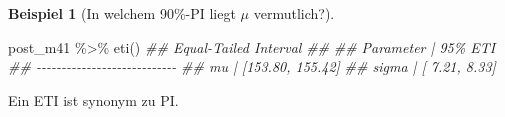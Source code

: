 \documentclass[
  a4paper,
  DIV=11]{scrreprt}
\newenvironment{Shaded}{\begin{snugshade}}{\end{snugshade}}
\newcommand{\DocumentationTok}[1]{\textcolor[rgb]{0.37,0.37,0.37}{\textit{#1}}}
\newcommand{\FunctionTok}[1]{\textcolor[rgb]{0.28,0.35,0.67}{#1}}
\newcommand{\NormalTok}[1]{\textcolor[rgb]{0.00,0.23,0.31}{#1}}
\newcommand{\SpecialCharTok}[1]{\textcolor[rgb]{0.37,0.37,0.37}{#1}}
\theoremstyle{definition}
\newtheorem{example}{Beispiel}[chapter]
\theoremstyle{remark}
\begin{document}
\leavevmode{}%
\begin{example}[In welchem 90\%-PI liegt \(\mu\)
vermutlich?]\label{exm-kung4}

\begin{Shaded}
\begin{Highlighting}[]
\NormalTok{post\_m41 }\SpecialCharTok{\%\textgreater{}\%} 
  \FunctionTok{eti}\NormalTok{()}
\DocumentationTok{\#\# Equal{-}Tailed Interval}
\DocumentationTok{\#\# }
\DocumentationTok{\#\# Parameter |          95\% ETI}
\DocumentationTok{\#\# {-}{-}{-}{-}{-}{-}{-}{-}{-}{-}{-}{-}{-}{-}{-}{-}{-}{-}{-}{-}{-}{-}{-}{-}{-}{-}{-}{-}}
\DocumentationTok{\#\# mu        | [153.80, 155.42]}
\DocumentationTok{\#\# sigma     | [  7.21,   8.33]}
\end{Highlighting}
\end{Shaded}

Ein ETI ist synonym zu PI.

\end{example}
\end{document}
